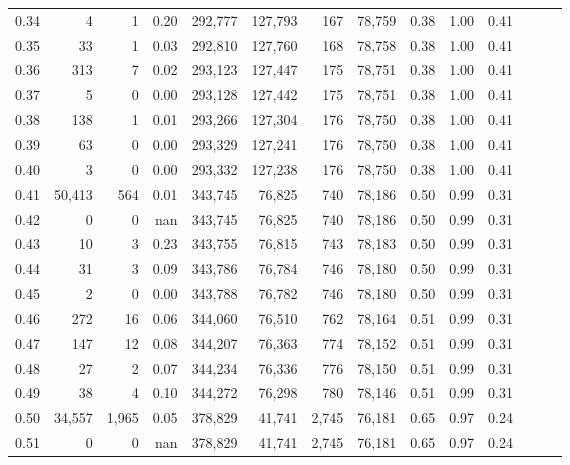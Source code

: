 \begin{tabular}{rrrrrrrrrrrrrr}
0.34 &       4 &       1 &  0.20 &  292,777 &  127,793 &     167 &  78,759 &  0.38 &  1.00 &      0.41 \\
0.35 &      33 &       1 &  0.03 &  292,810 &  127,760 &     168 &  78,758 &  0.38 &  1.00 &      0.41 \\
0.36 &     313 &       7 &  0.02 &  293,123 &  127,447 &     175 &  78,751 &  0.38 &  1.00 &      0.41 \\
0.37 &       5 &       0 &  0.00 &  293,128 &  127,442 &     175 &  78,751 &  0.38 &  1.00 &      0.41 \\
0.38 &     138 &       1 &  0.01 &  293,266 &  127,304 &     176 &  78,750 &  0.38 &  1.00 &      0.41 \\
0.39 &      63 &       0 &  0.00 &  293,329 &  127,241 &     176 &  78,750 &  0.38 &  1.00 &      0.41 \\
0.40 &       3 &       0 &  0.00 &  293,332 &  127,238 &     176 &  78,750 &  0.38 &  1.00 &      0.41 \\
0.41 &  50,413 &     564 &  0.01 &  343,745 &   76,825 &     740 &  78,186 &  0.50 &  0.99 &      0.31 \\
0.42 &       0 &       0 &   nan &  343,745 &   76,825 &     740 &  78,186 &  0.50 &  0.99 &      0.31 \\
0.43 &      10 &       3 &  0.23 &  343,755 &   76,815 &     743 &  78,183 &  0.50 &  0.99 &      0.31 \\
0.44 &      31 &       3 &  0.09 &  343,786 &   76,784 &     746 &  78,180 &  0.50 &  0.99 &      0.31 \\
0.45 &       2 &       0 &  0.00 &  343,788 &   76,782 &     746 &  78,180 &  0.50 &  0.99 &      0.31 \\
0.46 &     272 &      16 &  0.06 &  344,060 &   76,510 &     762 &  78,164 &  0.51 &  0.99 &      0.31 \\
0.47 &     147 &      12 &  0.08 &  344,207 &   76,363 &     774 &  78,152 &  0.51 &  0.99 &      0.31 \\
0.48 &      27 &       2 &  0.07 &  344,234 &   76,336 &     776 &  78,150 &  0.51 &  0.99 &      0.31 \\
0.49 &      38 &       4 &  0.10 &  344,272 &   76,298 &     780 &  78,146 &  0.51 &  0.99 &      0.31 \\
0.50 &  34,557 &   1,965 &  0.05 &  378,829 &   41,741 &   2,745 &  76,181 &  0.65 &  0.97 &      0.24 \\
0.51 &       0 &       0 &   nan &  378,829 &   41,741 &   2,745 &  76,181 &  0.65 &  0.97 &      0.24 \\

\end{tabular}
